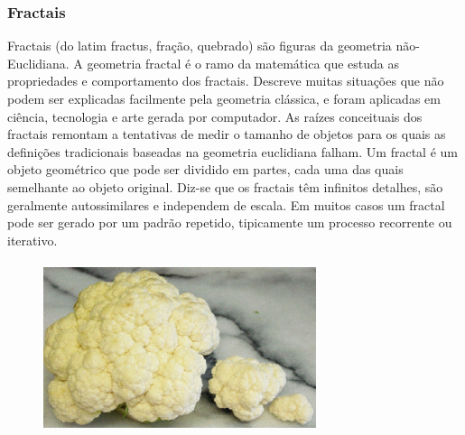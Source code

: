 \documentclass{beamer}
\begin{document}
\begin{frame}
\frametitle{Fractais}
	Fractais (do latim fractus, fração, quebrado) são figuras da geometria não-Euclidiana.
 	A geometria fractal é o ramo da matemática que estuda as propriedades e comportamento dos fractais. Descreve muitas situações que não podem ser explicadas facilmente pela geometria clássica, e foram aplicadas em ciência, tecnologia e arte gerada por computador. 
	As raízes conceituais dos fractais remontam a tentativas de medir o tamanho de objetos para os quais as definições tradicionais baseadas na geometria euclidiana falham.
	 Um fractal é um objeto geométrico que pode ser dividido em partes, cada uma das quais semelhante ao objeto original. Diz-se que os fractais têm infinitos detalhes, são geralmente autossimilares e independem de escala. Em muitos casos um fractal pode ser gerado por um padrão repetido, tipicamente um processo recorrente ou iterativo.
\end{frame}
\begin{frame}
	\begin{figure}[htb]
	\centering
    	    \includegraphics[width=8cm, height=5cm]{images/couve-flor.jpg}
       	        \vspace{0.01em}
	\end{figure}
\end{frame}
\end{document}
